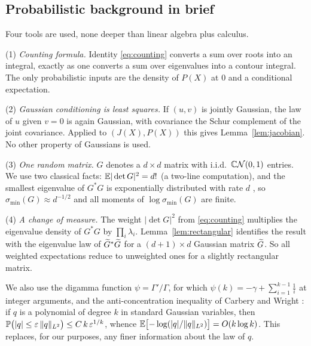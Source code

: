 \subsection{Probabilistic background in brief}\label{sec:background}

Four tools are used, none deeper than linear algebra plus calculus.

(1) \emph{Counting formula.} Identity \eqref{eq:counting} converts a sum over roots into an
integral, exactly as one converts a sum over eigenvalues into a contour integral. The only
probabilistic inputs are the density of $P(X)$ at $0$ and a conditional expectation.

(2) \emph{Gaussian conditioning is least squares.} If $(u,v)$ is jointly Gaussian, the law of
$u$ given $v=0$ is again Gaussian, with covariance the Schur complement of the joint
covariance. Applied to $(J(X),P(X))$ this gives Lemma~\ref{lem:jacobian}. No other property of
Gaussians is used.

(3) \emph{One random matrix.} $G$ denotes a $d\times d$ matrix with i.i.d.\ $\CN(0,1)$
entries. We use two classical facts: $\E|\det G|^2 = d!$ (a two-line computation), and the
smallest eigenvalue of $G^*G$ is exponentially distributed with rate $d$
\cite{edelman1988eigenvalues}, so $\sigma_{\min}(G)\approx d^{-1/2}$ and all moments of
$\log\sigma_{\min}(G)$ are finite.

(4) \emph{A change of measure.} The weight $|\det G|^2$ from \eqref{eq:counting} multiplies
the eigenvalue density of $G^*G$ by $\prod_i\lambda_i$. Lemma~\ref{lem:rectangular}
identifies the result with the eigenvalue law of $\wtd G^*\wtd G$ for a $(d+1)\times d$
Gaussian matrix $\wtd G$. So all weighted expectations reduce to unweighted ones for a
slightly rectangular matrix.

We also use the digamma function $\psi=\Gamma'/\Gamma$, for which
$\psi(k) = -\gamma+\sum_{i=1}^{k-1}\frac1i$ at integer arguments, and the anti-concentration
inequality of Carbery and Wright \cite{carbery2001distributional}: if $q$ is a polynomial of
degree $k$ in standard Gaussian variables, then
$\P\bigl(|q|\le\varepsilon\,\|q\|_{L^2}\bigr) \le C\,k\,\varepsilon^{1/k}$, whence
$\E\bigl[-\log(|q|/\|q\|_{L^2})\bigr] = O(k\log k)$. This replaces, for our purposes, any
finer information about the law of $q$.
